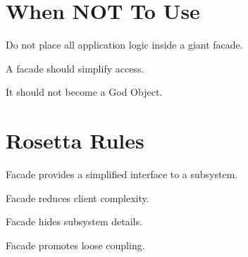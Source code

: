 \documentclass[11pt,a4paper]{book}
\begin{document}
\section{When NOT To Use}

\begin{trap}

Do not place all application
logic inside a giant facade.


A facade should simplify access.


It should not become a
God Object.

\end{trap}


\section{Rosetta Rules}

\begin{rosettarule}

Facade provides a simplified
interface to a subsystem.

\end{rosettarule}


\begin{rosettarule}

Facade reduces client complexity.

\end{rosettarule}


\begin{rosettarule}

Facade hides subsystem details.

\end{rosettarule}


\begin{rosettarule}

Facade promotes loose coupling.

\end{rosettarule}
\end{document}
